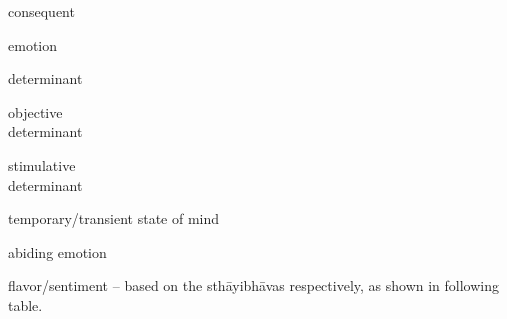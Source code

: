 \documentclass[12pt]{article}
\begin{document}
\setlength{\columnsep}{-3em}
\begin{multicols}{2}
	\begin{description}
		\setlength{\itemsep}{-0.25em}

		\item[anubhāva] consequent

		\item[bhāva] emotion

		\item[vibhāva] determinant

		      \vspace{-6pt}
		      \begin{description}[
				      itemindent=-3em
			      ]
			      \setlength{\itemsep}{-0.25em}
			      \item[ālambanavibhāva] objective \\ determinant

			      \item[uddīpanavibhāva] stimulative \\ determinant
		      \end{description}

		      \vspace{-4pt}
		\item[vyabhicārin/vyabhicāribhāva] temp\-orary/transient state of mind

		\item[sthāyibhāva] abiding emotion

		\item[rasa] flavor/sentiment -- based on the sthāyibhāvas respectively, as shown in following table.

	\end{description}
\end{multicols}
\end{document}

